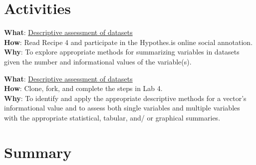 \documentclass[
  letterpaper,
]{latex/krantz}
\begin{document}
\hypertarget{activities-2}{%
\section*{Activities}\label{activities-2}}

\begin{tcolorbox}[enhanced jigsaw, opacitybacktitle=0.6, breakable, colframe=quarto-callout-tip-color-frame, arc=.35mm, left=2mm, leftrule=.75mm, title=\textcolor{quarto-callout-tip-color}{\faLightbulb}\hspace{0.5em}{Recipe}, opacityback=0, colback=white, toptitle=1mm, rightrule=.15mm, titlerule=0mm, bottomtitle=1mm, bottomrule=.15mm, coltitle=black, colbacktitle=quarto-callout-tip-color!10!white, toprule=.15mm]
\textbf{What}:
\href{https://lin380.github.io/tadr/articles/recipe_4.html}{Descriptive
assessment of datasets}\\
\textbf{How}: Read Recipe 4 and participate in the Hypothes.is online
social annotation.\\
\textbf{Why}: To explore appropriate methods for summarizing variables
in datasets given the number and informational values of the
variable(s).
\end{tcolorbox}

\begin{tcolorbox}[enhanced jigsaw, opacitybacktitle=0.6, breakable, colframe=quarto-callout-tip-color-frame, arc=.35mm, left=2mm, leftrule=.75mm, title=\textcolor{quarto-callout-tip-color}{\faLightbulb}\hspace{0.5em}{Lab}, opacityback=0, colback=white, toptitle=1mm, rightrule=.15mm, titlerule=0mm, bottomtitle=1mm, bottomrule=.15mm, coltitle=black, colbacktitle=quarto-callout-tip-color!10!white, toprule=.15mm]
\textbf{What}: \href{https://github.com/lin380/lab_4}{Descriptive
assessment of datasets}\\
\textbf{How}: Clone, fork, and complete the steps in Lab 4.\\
\textbf{Why}: To identify and apply the appropriate descriptive methods
for a vector's informational value and to assess both single variables
and multiple variables with the appropriate statistical, tabular, and/
or graphical summaries.
\end{tcolorbox}

\hypertarget{summary-3}{%
\section*{Summary}\label{summary-3}}
\end{document}
